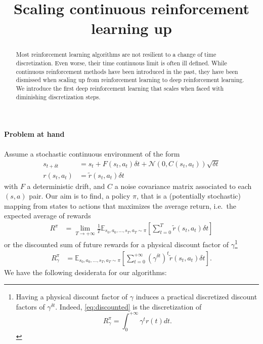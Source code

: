 \documentclass[11pt]{article}
\title{Scaling continuous reinforcement learning up}
\newcommand{\deltat}{{\delta t}}
\newcommand{\gauss}{\mathcal{N}}
\newcommand{\E}{\mathbb{E}}
\begin{document}
\maketitle
\begin{abstract}
	Most reinforcement learning algorithms are not resilient to a change of
	time discretization. Even worse, their time continuous limit is often
	ill defined.  While continuous reinforcement methods have been
	introduced in the past, they have been dismissed when scaling up from
	reinforcement learning to deep reinforcement learning. We introduce the
	first deep reinforcement learning that scales when faced with
	diminishing discretization steps.
\end{abstract}
\paragraph{Problem at hand}
Assume a stochastic continuous environment of the form
\begin{align}
	s_{t+\deltat} &= s_t + F(s_t, a_t) \deltat + \gauss(0, C(s_t, a_t)) \sqrt{\deltat}\\
	r(s_t, a_t) &= \tilde{r}(s_t, a_t) \deltat
\end{align}
with $F$ a deterministic drift, and $C$ a noise covariance matrix
associated to each $(s, a)$ pair. Our aim is to find, a policy $\pi$, that is a
(potentially stochastic) mapping from states to actions that maximizes the
average return, i.e.\ the expected average of rewards
\begin{align}
	R^\pi &= \lim\limits_{T\to+\infty}
	\frac{1}{T}
	\E_{s_0, a_0, \ldots, s_T, a_T\sim\pi}\left[
		\sum\limits_{t = 0}^T \tilde{r}(s_t, a_t)\deltat
	\right]
\end{align}
or the discounted sum of future rewards for a physical discount factor of $\gamma$\footnote{
	Having a physical discount factor of $\gamma$ induces a practical discretized discount
	factors of $\gamma^\deltat$. Indeed, \eqref{eq:discounted} is the discretization of
	\begin{equation}
		R^\pi_\gamma = \int_{0}^{+\infty} \gamma^{t} r(t) dt.
		\label{eq:discounted}
	\end{equation}
}
\begin{align}
	R^\pi_\gamma &= \E_{s_0, a_0, \ldots, s_T, a_T \sim \pi}
	\left[
		\sum\limits_{t=0}^{+\infty}
		(\gamma^\deltat)^t \tilde{r}(s_t, a_t)\deltat 
	\right].
\end{align}
We have the following desiderata for our algorithms:
\end{document}
